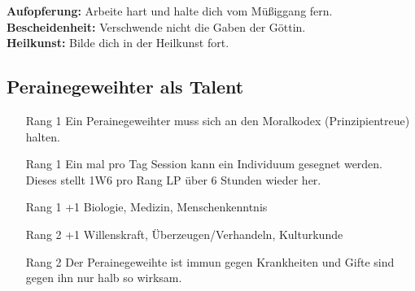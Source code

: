 \documentclass[../../Heldenanleitung2]{subfiles}
\begin{document}
\noindent
\textbf{Aufopferung:} Arbeite hart und halte dich vom
Müßiggang fern.\\

\noindent
\textbf{Bescheidenheit:} Verschwende nicht die Gaben der
Göttin.\\

\noindent
\textbf{Heilkunst:} Bilde dich in der Heilkunst fort.

\subsection{Perainegeweihter als Talent}
\begin{itemize}
	\item[Rang 1] Ein Perainegeweihter muss sich an den Moralkodex
(Prinzipientreue) halten.
	\item[Rang 1] Ein mal pro Tag Session kann ein Individuum gesegnet werden. Dieses stellt 1W6 pro Rang LP über 6 Stunden wieder her.
	\item[Rang 1] +1 Biologie, Medizin, Menschenkenntnis
	\item[Rang 2] +1 Willenskraft, Überzeugen/Verhandeln, Kulturkunde
	\item[Rang 2] Der Perainegeweihte ist immun gegen Krankheiten und Gifte sind gegen ihn nur halb so wirksam.
\end{itemize}
\end{document}

